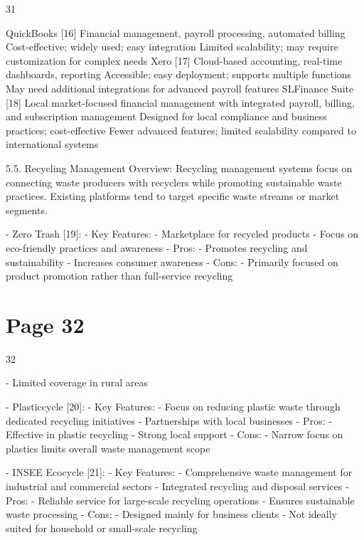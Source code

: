 \documentclass{article}
\begin{document}
 
 31  
 
QuickBooks [16] Financial 
management, payroll 
processing, 
automated billing 
Cost-effective; widely 
used; easy 
integration 
Limited scalability; 
may require 
customization for 
complex needs 
Xero [17] Cloud-based 
accounting, real-time 
dashboards, 
reporting 
Accessible; easy 
deployment; 
supports multiple 
functions 
May need additional 
integrations for 
advanced payroll 
features 
SLFinance Suite [18] Local market-focused 
financial 
management with 
integrated payroll, 
billing, and 
subscription 
management 
Designed for local 
compliance and 
business practices; 
cost-effective 
Fewer advanced 
features; limited 
scalability compared 
to international 
systems 
 
5.5. Recycling Management 
Overview:   
Recycling management systems focus on connecting waste producers with recyclers while 
promoting sustainable waste practices. Existing platforms tend to target specific waste streams 
or market segments. 
 
- Zero Trash [19]:   
  - Key Features:   
    - Marketplace for recycled products   
    - Focus on eco-friendly practices and awareness   
  - Pros:   
    - Promotes recycling and sustainability   
    - Increases consumer awareness   
  - Cons:   
    - Primarily focused on product promotion rather than full-service recycling   

\section*{Page 32}
   
 
 32  
 
    - Limited coverage in rural areas 
 
- Plasticcycle [20]:   
  - Key Features:   
    - Focus on reducing plastic waste through dedicated recycling initiatives   
    - Partnerships with local businesses   
  - Pros:   
    - Effective in plastic recycling   
    - Strong local support   
  - Cons:   
    - Narrow focus on plastics limits overall waste management scope 
 
- INSEE Ecocycle [21]:   
  - Key Features:   
    - Comprehensive waste management for industrial and commercial sectors   
    - Integrated recycling and disposal services   
  - Pros:   
    - Reliable service for large-scale recycling operations   
    - Ensures sustainable waste processing   
  - Cons:   
    - Designed mainly for business clients   
    - Not ideally suited for household or small-scale recycling 
 
\end{document}
